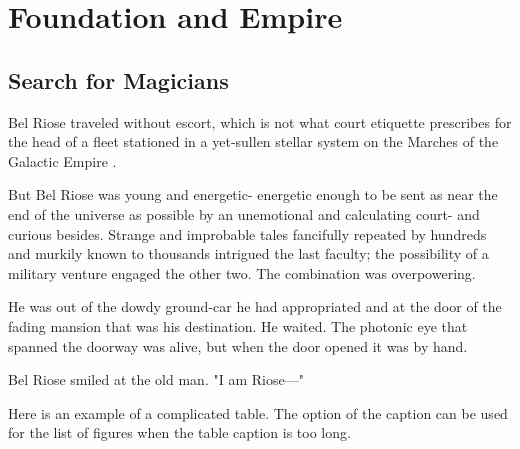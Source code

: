 
\chapter[Foundation and Empire][Chapter Two]{Foundation and Empire}

\newpage


\section{Search for Magicians}
Bel Riose traveled without escort, which is not what court etiquette prescribes for the head of a fleet stationed in a yet-sullen stellar system on the Marches of the Galactic Empire \citep{asimov1952foundation}.

But Bel Riose was young and energetic- energetic enough to be sent as near the end of the universe as possible by an unemotional and calculating court- and curious besides. Strange and improbable tales fancifully repeated by hundreds and murkily known to thousands intrigued the last faculty; the possibility of a military venture engaged the other two. The combination was overpowering.

He was out of the dowdy ground-car he had appropriated and at the door of the fading mansion that was his destination. He waited. The photonic eye that spanned the doorway was alive, but when the door opened it was by hand.

Bel Riose smiled at the old man. "I am Riose---"

Here is an example of a complicated table. %
The option of the caption can be used for the list of figures when the table caption is too long. %

